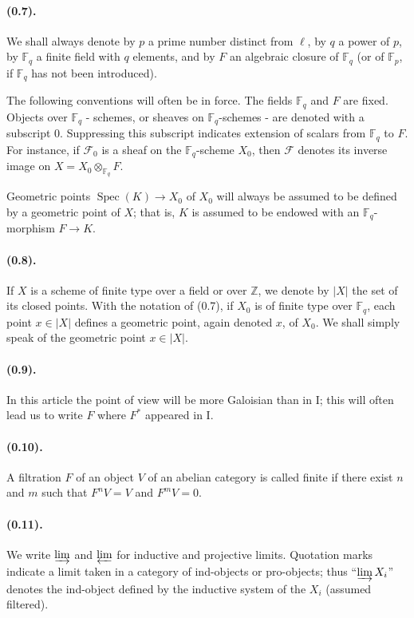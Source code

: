 \documentclass[11pt]{article}
\theoremstyle{remark}
\newcommand{\Fq}{\mathbb{F}_q}
\newcommand{\Spec}{\operatorname{Spec}}
\newcommand{\limind}{\varinjlim}
\newcommand{\limproj}{\varprojlim}
\begin{document}
\paragraph{(0.7).} We shall always denote by $p$ a prime number distinct from $\ell$, by $q$ a power of $p$, by $\Fq$ a finite field with $q$ elements, and by $F$ an algebraic closure of $\Fq$ (or of $\mathbb F_p$, if $\Fq$ has not been introduced).

The following conventions will often be in force. The fields $\Fq$ and $F$ are fixed. Objects over $\Fq$ - schemes, or sheaves on $\Fq$-schemes - are denoted with a subscript $0$. Suppressing this subscript indicates extension of scalars from $\Fq$ to $F$. For instance, if $\mathcal F_0$ is a sheaf on the $\Fq$-scheme $X_0$, then $\mathcal F$ denotes its inverse image on $X=X_0\otimes_{\Fq}F$.

Geometric points $\Spec(K)\to X_0$ of $X_0$ will always be assumed to be defined by a geometric point of $X$; that is, $K$ is assumed to be endowed with an $\Fq$-morphism $F\to K$.

\paragraph{(0.8).} If $X$ is a scheme of finite type over a field or over $\mathbb Z$, we denote by $|X|$ the set of its closed points. With the notation of (0.7), if $X_0$ is of finite type over $\Fq$, each point $x\in |X|$ defines a geometric point, again denoted $x$, of $X_0$. We shall simply speak of the geometric point $x\in |X|$.

\paragraph{(0.9).} In this article the point of view will be more Galoisian than in I; this will often lead us to write $F$ where $F^*$ appeared in I.

\paragraph{(0.10).} A filtration $F$ of an object $V$ of an abelian category is called finite if there exist $n$ and $m$ such that $F^nV=V$ and $F^mV=0$.

\paragraph{(0.11).} We write $\limind$ and $\limproj$ for inductive and projective limits. Quotation marks indicate a limit taken in a category of ind-objects or pro-objects; thus ``$\limind X_i$'' denotes the ind-object defined by the inductive system of the $X_i$ (assumed filtered).
\end{document}
